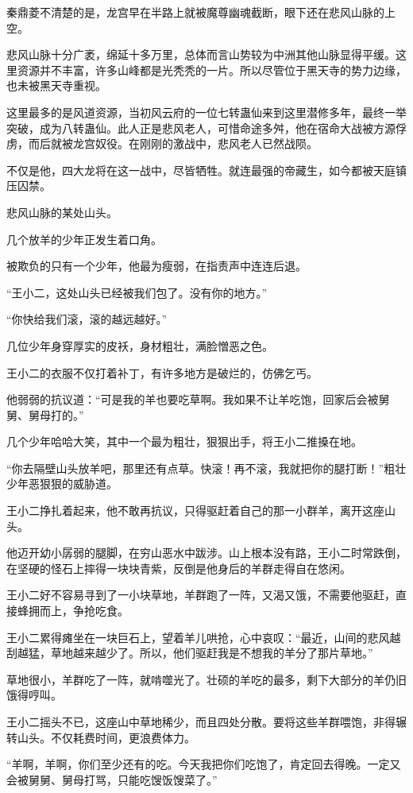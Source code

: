 \begin{this_body}
秦鼎菱不清楚的是，龙宫早在半路上就被魔尊幽魂截断，眼下还在悲风山脉的上空。

悲风山脉十分广袤，绵延十多万里，总体而言山势较为中洲其他山脉显得平缓。这里资源并不丰富，许多山峰都是光秃秃的一片。所以尽管位于黑天寺的势力边缘，也未被黑天寺重视。

这里最多的是风道资源，当初风云府的一位七转蛊仙来到这里潜修多年，最终一举突破，成为八转蛊仙。此人正是悲风老人，可惜命途多舛，他在宿命大战被方源俘虏，而后就被龙宫奴役。在刚刚的激战中，悲风老人已然战陨。

不仅是他，四大龙将在这一战中，尽皆牺牲。就连最强的帝藏生，如今都被天庭镇压囚禁。

悲风山脉的某处山头。

几个放羊的少年正发生着口角。

被欺负的只有一个少年，他最为瘦弱，在指责声中连连后退。

“王小二，这处山头已经被我们包了。没有你的地方。”

“你快给我们滚，滚的越远越好。”

几位少年身穿厚实的皮袄，身材粗壮，满脸憎恶之色。

王小二的衣服不仅打着补丁，有许多地方是破烂的，仿佛乞丐。

他弱弱的抗议道：“可是我的羊也要吃草啊。我如果不让羊吃饱，回家后会被舅舅、舅母打的。”

几个少年哈哈大笑，其中一个最为粗壮，狠狠出手，将王小二推搡在地。

“你去隔壁山头放羊吧，那里还有点草。快滚！再不滚，我就把你的腿打断！”粗壮少年恶狠狠的威胁道。

王小二挣扎着起来，他不敢再抗议，只得驱赶着自己的那一小群羊，离开这座山头。

他迈开幼小孱弱的腿脚，在穷山恶水中跋涉。山上根本没有路，王小二时常跌倒，在坚硬的怪石上摔得一块块青紫，反倒是他身后的羊群走得自在悠闲。

王小二好不容易寻到了一小块草地，羊群跑了一阵，又渴又饿，不需要他驱赶，直接蜂拥而上，争抢吃食。

王小二累得瘫坐在一块巨石上，望着羊儿哄抢，心中哀叹：“最近，山间的悲风越刮越猛，草地越来越少了。所以，他们驱赶我是不想我的羊分了那片草地。”

草地很小，羊群吃了一阵，就啃噬光了。壮硕的羊吃的最多，剩下大部分的羊仍旧饿得哼叫。

王小二摇头不已，这座山中草地稀少，而且四处分散。要将这些羊群喂饱，非得辗转山头。不仅耗费时间，更浪费体力。

“羊啊，羊啊，你们至少还有的吃。今天我把你们吃饱了，肯定回去得晚。一定又会被舅舅、舅母打骂，只能吃馊饭馊菜了。”


\end{this_body}
